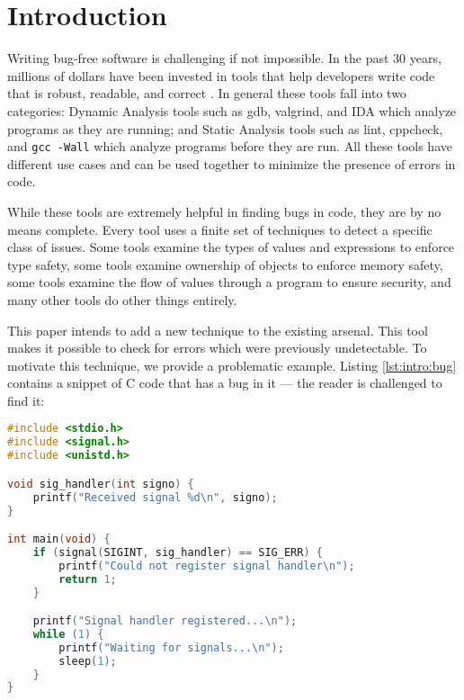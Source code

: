 \chapter{Introduction}\label{sec:intro}

Writing bug-free software is challenging if not impossible.  In the past 30 years, millions of dollars have been invested in tools that help developers write code that is robust, readable, and correct \cite{staticanal}.  In general these tools fall into two categories:  Dynamic Analysis tools such as gdb, valgrind, and IDA which analyze programs as they are running; and Static Analysis tools such as lint, cppcheck, and \lstinline{gcc -Wall} which analyze programs before they are run.  All these tools have different use cases and can be used together to minimize the presence of errors in code.

While these tools are extremely helpful in finding bugs in code, they are by no means complete.  Every tool uses a finite set of techniques to detect a specific class of issues.  Some tools examine the types of values and expressions to enforce type safety\cite{staticanal}, some tools examine ownership of objects to enforce memory safety\cite{rust-is-dope}, some tools examine the flow of values through a program to ensure security\cite{jqual-inference}, and many other tools do other things entirely.  

This paper intends to add a new technique to the existing arsenal.  This tool makes it possible to check for errors which were previously undetectable.  To motivate this technique, we provide a problematic example.  Listing \ref{lst:intro:bug} contains a snippet of C code that has a bug in it --- the reader is challenged to find it:

\noindent\begin{minipage}[c]{0.95\textwidth}
\begin{lstlisting}[language=C,label={lst:intro:bug},caption={Example piece of C code containing an error}]
#include <stdio.h>
#include <signal.h>
#include <unistd.h>

void sig_handler(int signo) {
    printf("Received signal %d\n", signo);
}

int main(void) {
    if (signal(SIGINT, sig_handler) == SIG_ERR) {
        printf("Could not register signal handler\n");
        return 1;
    }

    printf("Signal handler registered...\n");
    while (1) {
        printf("Waiting for signals...\n");
        sleep(1);
    }
}
\end{lstlisting}
\end{minipage}

